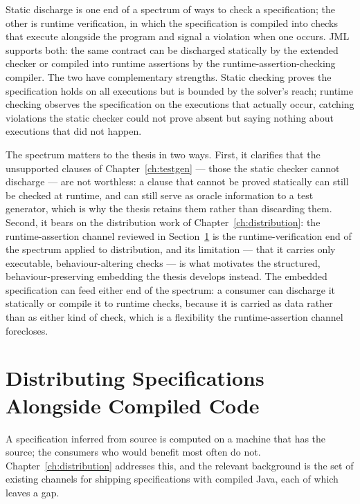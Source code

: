 Static discharge is one end of a spectrum of ways to check a specification; the
other is runtime verification, in which the specification is compiled into checks
that execute alongside the program and signal a violation when one occurs. JML
supports both: the same contract can be discharged statically by the extended
checker or compiled into runtime assertions by the runtime-assertion-checking
compiler. The two have complementary strengths. Static checking proves the
specification holds on all executions but is bounded by the solver's reach;
runtime checking observes the specification on the executions that actually occur,
catching violations the static checker could not prove absent but saying nothing
about executions that did not happen.

The spectrum matters to the thesis in two ways. First, it clarifies that the
unsupported clauses of Chapter~\ref{ch:testgen} --- those the static checker
cannot discharge --- are not worthless: a clause that cannot be proved statically
can still be checked at runtime, and can still serve as oracle information to a
test generator, which is why the thesis retains them rather than discarding them.
Second, it bears on the distribution work of Chapter~\ref{ch:distribution}: the
runtime-assertion channel reviewed in Section~\ref{sec:bg-distribution} is the
runtime-verification end of the spectrum applied to distribution, and its
limitation --- that it carries only executable, behaviour-altering checks --- is
what motivates the structured, behaviour-preserving embedding the thesis develops
instead. The embedded specification can feed either end of the spectrum: a
consumer can discharge it statically or compile it to runtime checks, because it
is carried as data rather than as either kind of check, which is a flexibility the
runtime-assertion channel forecloses.

\section{Distributing Specifications Alongside Compiled Code}
\label{sec:bg-distribution}

A specification inferred from source is computed on a machine that has the
source; the consumers who would benefit most often do not.
Chapter~\ref{ch:distribution} addresses this, and the relevant background is
the set of existing channels for shipping specifications with compiled Java,
each of which leaves a gap.

